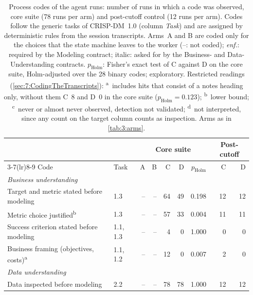 \begin{table}[htbp]
  \centering
  \footnotesize
  \caption[Process codes of the agent runs]{Process codes of the agent runs: number of runs in which a code was observed, core suite (78 runs per arm) and post-cutoff control (12 runs per arm). Codes follow the generic tasks of CRISP-DM~1.0 (column \emph{Task}) and are assigned by deterministic rules from the session transcripts. Arms~A and B are coded only for the choices that the state machine leaves to the worker (--: not coded); \emph{enf.}: required by the Modeling contract; italic: asked for by the Business- and Data-Understanding contracts. $p_\mathrm{Holm}$: Fisher's exact test of C against D on the core suite, Holm-adjusted over the 28 binary codes; exploratory. Restricted readings (\autoref{sec:7:CodingTheTranscripts}): \textsuperscript{a}~includes hits that consist of a notes heading only, without them C~8 and D~0 in the core suite ($p_\mathrm{Holm} = 0.123$); \textsuperscript{b}~lower bound; \textsuperscript{c}~never or almost never observed, detection not validated; \textsuperscript{d}~not interpreted, since any count on the target column counts as inspection. Arms as in \autoref{tab:3:arms}.}
  \label{tab:7:process}
  \setlength{\tabcolsep}{4.5pt}
  \begin{tabular}{llrrrrrrr}
    \toprule
     & & \multicolumn{5}{c}{Core suite} & \multicolumn{2}{c}{Post-cutoff} \\
    \cmidrule(lr){3-7}\cmidrule(lr){8-9}
    Code & Task & A & B & C & D & $p_\mathrm{Holm}$ & C & D \\
    \midrule
    \multicolumn{9}{l}{\emph{Business understanding}} \\
    \quad Target and metric stated before modeling & 1.3 & -- & -- & 64 & 49 & 0.198 & 12 & 12 \\
    \quad Metric choice justified\textsuperscript{b} & 1.3 & -- & -- & 57 & 33 & 0.004 & 11 & 11 \\
    \quad Success criterion stated before modeling & 1.1, 1.3 & -- & -- & 4 & 0 & 1.000 & 0 & 0 \\
    \quad Business framing (objectives, costs)\textsuperscript{a} & 1.1, 1.2 & -- & -- & 12 & 0 & 0.007 & 2 & 0 \\
    \midrule
    \multicolumn{9}{l}{\emph{Data understanding}} \\
    \quad Data inspected before modeling & 2.2 & -- & -- & 78 & 78 & 1.000 & 12 & 12 \\

\end{tabular}
\end{table}
